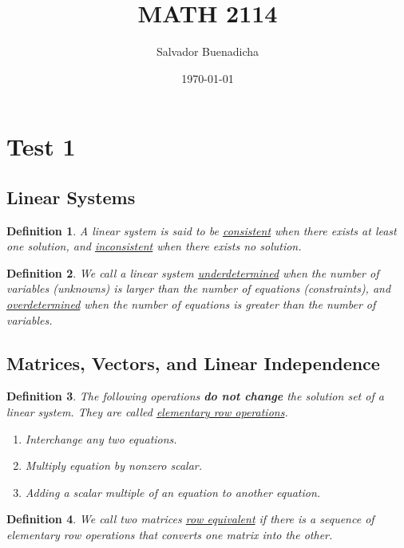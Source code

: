 \documentclass{article}
\title{MATH 2114}
\author{Salvador Buenadicha}
\date{\today}
\theoremstyle{definitionstyle}
\newtheorem{definition}{Definition}[section]
\begin{document}
\maketitle

\section{Test 1}

\subsection{Linear Systems}

\begin{definition}
    A linear system is said to be \underline{consistent} when there exists at least one solution,
    and \underline{inconsistent} when there exists no solution.
\end{definition}

\begin{definition}
    We call a linear system \underline{underdetermined} when the number of variables (unknowns) is
    larger than the number of equations (constraints), and \underline{overdetermined} when the number
    of equations is greater than the number of variables.
\end{definition}

\subsection{Matrices, Vectors, and Linear Independence}

\begin{definition}
    The following operations \textbf{do not change} the solution set of a linear system. They are
    called \underline{elementary row operations}.
    \begin{enumerate}
        \item Interchange any two equations.
        \item Multiply equation by nonzero scalar.
        \item Adding a scalar multiple of an equation to another equation.
        \end{enumerate}
\end{definition}

\begin{definition}
    We call two matrices \underline{row equivalent} if there is a sequence of elementary row 
    operations that converts one matrix into the other.
\end{definition}
\end{document}
